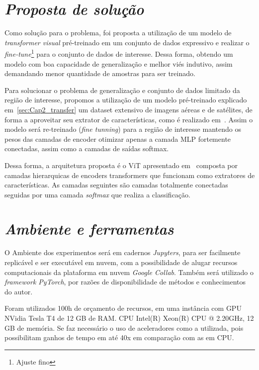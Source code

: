 \section{\textit{Proposta de solução}}\label{sec:Cap3_Proposta}

Como solução para o problema, foi proposta a utilização de um modelo de \textit{transformer visual}  pré-treinado em um conjunto de dados expressivo e realizar o \textit{fine-tune}\footnote{Ajuste fino} para o conjunto de dados de interesse. Dessa forma, obtendo um modelo com boa capacidade de generalização e melhor viés indutivo, assim demandando menor quantidade de amostras para ser treinado.

Para solucionar o problema de generalização e conjunto de dados limitado da região de interesse, propomos a utilização de um modelo pré-treinado explicado em~\ref{sec:Cap2_transfer} um dataset extensivo de imagens aéreas e de satélites, de forma a aproveitar seu extrator de características, como é realizado em~\cite{wang2022empirical}. Assim o modelo será re-treinado (\textit{fine tunning}) para a região de interesse mantendo os pesos das camadas de encoder otimizar apenas a camada MLP fortemente conectadas, assim como a camadas de saídas softmax. 

Dessa forma, a arquitetura proposta é o ViT apresentado em~\cite{wang2022empirical}
composta por camadas hierarquicas de encoders transformers  que funcionam como extratores de características. As camadas seguintes são camadas totalmente conectadas seguidas por uma camada \textit{softmax} que realiza a classificação.

\section{\textit{Ambiente e ferramentas}}\label{sec:Cap3_Ferramentas}


O Ambiente dos experimentos será em cadernos \textit{Jupyters}, para ser facilmente replicável e ser executável em nuvem, com a possibilidade de alugar recursos computacionais da plataforma em nuvem \textit{Google Collab}. Também será utilizado o \textit{framework PyTorch}, por razões de disponibilidade de métodos e conhecimentos do autor. 

Foram utilizados 100h de orçamento de recursos, em uma instância com GPU NVidia Tesla T4 de 12 GB de RAM. CPU Intel(R) Xeon(R) CPU @ 2.20GHz, 12 GB de memória. Se faz necessário o uso de aceleradores como a utilizada, pois possibilitam ganhos de tempo em até 40x em comparação com as em CPU.

